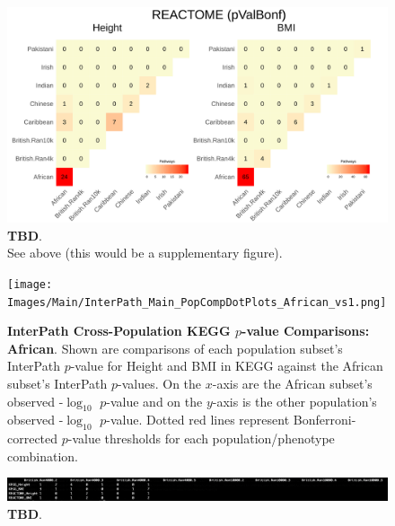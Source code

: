 \documentclass[12pt, a4paper]{article}
\begin{document}
\begin{figure}[htbp]
\centering
\includegraphics[scale=.225]{Images/Supp/InterPath_Supp_Figure_Heatplots_REACTOME_vs1.png}
\caption[TBD]{\textbf{TBD}. \\ See above (this would be a supplementary figure).}
\label{InterPath-Supp-Figure-Heatplots-REACTOME}
\end{figure}

\begin{figure}[htbp]
\centering
\texttt{[image: Images/Main/InterPath\_Main\_PopCompDotPlots\_African\_vs1.png]}
\caption[]{\textbf{InterPath Cross-Population KEGG $p$-value Comparisons: African}. Shown are comparisons of each population subset's InterPath $p$-value for Height and BMI in KEGG against the African subset's InterPath $p$-values. On the $x$-axis are the African subset's observed -$\log_{10}$ $p$-value and on the $y$-axis is the other population's observed -$\log_{10}$ $p$-value. Dotted red lines represent Bonferroni-corrected $p$-value thresholds for each population/phenotype combination.}
\label{InterPath-Main-Figure-PopCompDotPlots}
\end{figure}

\begin{landscape}
\begin{figure}[htbp]
\centering
\hspace*{-.5cm}
\includegraphics[scale=1]{Images/Supp/InterPath_Supp_Figure_BritReps_Barplot_Temp.png}
\caption[TBD]{\textbf{TBD}. }
\label{InterPath-Supp-Figure-BritReps-Barplots}
\end{figure}
\end{landscape}
\end{document}
